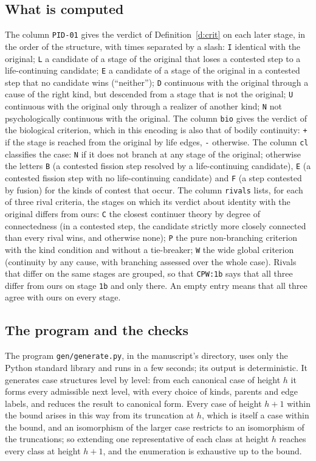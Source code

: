 \documentclass{situationist-preprint}
\begin{document}
\subsection*{What is computed}

The column \texttt{PID-01} gives the verdict of Definition~\ref{d:crit} on each later stage, in the order of the structure, with times separated by a slash: \texttt{I} identical with the original; \texttt{L} a candidate of a stage of the original that loses a contested step to a life-continuing candidate; \texttt{E} a candidate of a stage of the original in a contested step that no candidate wins (\enquote{neither}); \texttt{D} continuous with the original through a cause of the right kind, but descended from a stage that is not the original; \texttt{U} continuous with the original only through a realizer of another kind; \texttt{N} not psychologically continuous with the original. The column \texttt{bio} gives the verdict of the biological criterion, which in this encoding is also that of bodily continuity: \texttt{+} if the stage is reached from the original by life edges, \texttt{-} otherwise. The column \texttt{cl} classifies the case: \texttt{N} if it does not branch at any stage of the original; otherwise the letters \texttt{B} (a contested fission step resolved by a life-continuing candidate), \texttt{E} (a contested fission step with no life-continuing candidate) and \texttt{F} (a step contested by fusion) for the kinds of contest that occur. The column \texttt{rivals} lists, for each of three rival criteria, the stages on which its verdict about identity with the original differs from ours: \texttt{C} the closest continuer theory by degree of connectedness (in a contested step, the candidate strictly more closely connected than every rival wins, and otherwise none); \texttt{P} the pure non-branching criterion with the kind condition and without a tie-breaker; \texttt{W} the wide global criterion (continuity by any cause, with branching assessed over the whole case). Rivals that differ on the same stages are grouped, so that \texttt{CPW:1b} says that all three differ from ours on stage \texttt{1b} and only there. An empty entry means that all three agree with ours on every stage.

\subsection*{The program and the checks}

The program \texttt{gen/generate.py}, in the manuscript's directory, uses only the Python standard library and runs in a few seconds; its output is deterministic. It generates case structures level by level: from each canonical case of height $h$ it forms every admissible next level, with every choice of kinds, parents and edge labels, and reduces the result to canonical form. Every case of height $h+1$ within the bound arises in this way from its truncation at $h$, which is itself a case within the bound, and an isomorphism of the larger case restricts to an isomorphism of the truncations; so extending one representative of each class at height $h$ reaches every class at height $h+1$, and the enumeration is exhaustive up to the bound.
\end{document}
